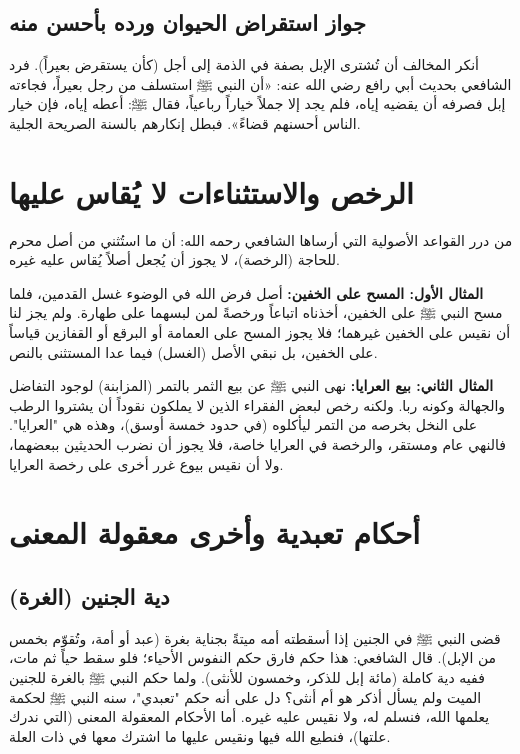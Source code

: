 \subsection{جواز استقراض الحيوان ورده بأحسن منه}
أنكر المخالف أن تُشترى الإبل بصفة في الذمة إلى أجل (كأن يستقرض بعيراً). فرد الشافعي بحديث أبي رافع رضي الله عنه: «أن النبي ﷺ استسلف من رجل بعيراً، فجاءته إبل فصرفه أن يقضيه إياه، فلم يجد إلا جملاً خياراً رباعياً، فقال ﷺ: أعطه إياه، فإن خيار الناس أحسنهم قضاءً». فبطل إنكارهم بالسنة الصريحة الجلية.

\section{الرخص والاستثناءات لا يُقاس عليها}
من درر القواعد الأصولية التي أرساها الشافعي رحمه الله: أن ما استُثني من أصل محرم للحاجة (الرخصة)، لا يجوز أن يُجعل أصلاً يُقاس عليه غيره.

\textbf{المثال الأول: المسح على الخفين:}
أصل فرض الله في الوضوء غسل القدمين، فلما مسح النبي ﷺ على الخفين، أخذناه اتباعاً ورخصةً لمن لبسهما على طهارة. ولم يجز لنا أن نقيس على الخفين غيرهما؛ فلا يجوز المسح على العمامة أو البرقع أو القفازين قياساً على الخفين، بل نبقي الأصل (الغسل) فيما عدا المستثنى بالنص.

\textbf{المثال الثاني: بيع العرايا:}
نهى النبي ﷺ عن بيع الثمر بالتمر (المزابنة) لوجود التفاضل والجهالة وكونه ربا. ولكنه رخص لبعض الفقراء الذين لا يملكون نقوداً أن يشتروا الرطب على النخل بخرصه من التمر ليأكلوه (في حدود خمسة أوسق)، وهذه هي "العرايا".
فالنهي عام ومستقر، والرخصة في العرايا خاصة، فلا يجوز أن نضرب الحديثين ببعضهما، ولا أن نقيس بيوع غرر أخرى على رخصة العرايا.

\section{أحكام تعبدية وأخرى معقولة المعنى}

\subsection{دية الجنين (الغرة)}
قضى النبي ﷺ في الجنين إذا أسقطته أمه ميتةً بجناية بغرة (عبد أو أمة، وتُقوّم بخمس من الإبل).
قال الشافعي: هذا حكم فارق حكم النفوس الأحياء؛ فلو سقط حياً ثم مات، ففيه دية كاملة (مائة إبل للذكر، وخمسون للأنثى). ولما حكم النبي ﷺ بالغرة للجنين الميت ولم يسأل أذكر هو أم أنثى؟ دل على أنه حكم "تعبدي"، سنه النبي ﷺ لحكمة يعلمها الله، فنسلم له، ولا نقيس عليه غيره. 
أما الأحكام المعقولة المعنى (التي ندرك علتها)، فنطيع الله فيها ونقيس عليها ما اشترك معها في ذات العلة.

